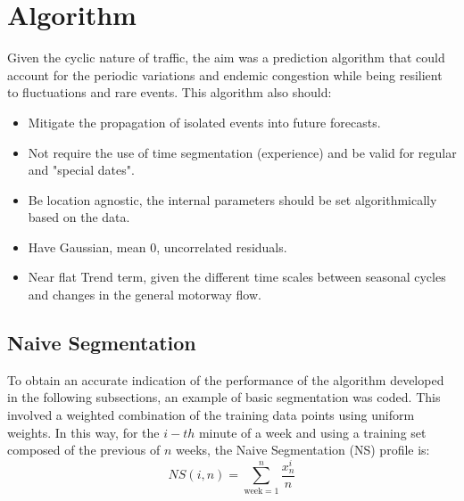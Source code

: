 \documentclass[conference]{IEEEtran}
\begin{document}
\section{Algorithm} \label{algorithm}
Given the cyclic nature of traffic, the aim was a prediction algorithm that could account for the periodic variations and endemic congestion while being resilient to fluctuations and rare events. This algorithm also should:
\begin{itemize}
	\item Mitigate the propagation of isolated events into future forecasts.
	\item Not require the use of time segmentation (experience) and be valid for regular and "special dates".
	\item Be location agnostic, the internal parameters should be set algorithmically based on the data.
	\item Have Gaussian, mean 0, uncorrelated residuals.
	\item Near flat Trend term, given the different time scales between seasonal cycles and changes in the general motorway flow.
\end{itemize}

\subsection{Naive Segmentation}
To obtain an accurate indication of the performance of the algorithm developed in the following subsections, an example of basic segmentation was coded. 
This involved a weighted combination of the training data points using uniform weights. 
In this way, for the $i-th$ minute of a week and using a training set composed of the previous of $n$ weeks, the Naive Segmentation (NS) profile is:
\begin{equation}
NS(i,n) = \sum_{\textrm{week}=1}^{n} \frac{x^i_n}{n} 
\end{equation}
\end{document}
